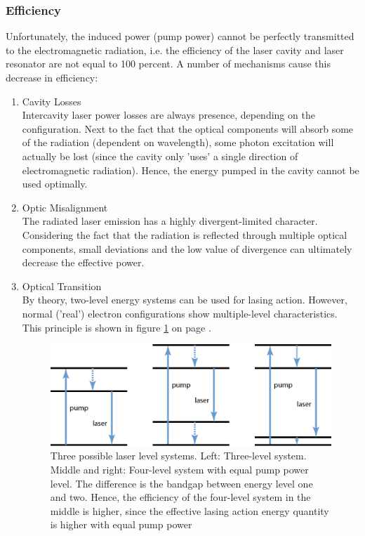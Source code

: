 	\subsubsection{Efficiency}
Unfortunately, the induced power (pump power) cannot be perfectly transmitted to the electromagnetic radiation, i.e. the efficiency of the \acs{laser} cavity and \acs{laser} resonator are not equal to 100 percent. A number of mechanisms cause this decrease in efficiency:
	\begin{enumerate}
		\item{Cavity Losses}\\
Intercavity \acs{laser} power losses are always presence, depending on the configuration. Next to the fact that the optical components will absorb some of the radiation (dependent on wavelength), some photon excitation will actually be lost (since the cavity only 'uses' a single direction of electromagnetic radiation). Hence, the energy pumped in the cavity cannot be used optimally. 
		\item{Optic Misalignment}\\
The radiated \acs{laser} emission has a highly divergent-limited character. Considering the fact that the radiation is reflected through multiple optical components, small deviations and the low value of divergence can ultimately decrease the effective power.
		\item{Optical Transition}\\
By theory, two-level energy systems can be used for lasing action. However, normal ('real') electron configurations show multiple-level characteristics. This principle is shown in figure \ref{fig:4_level_system} on page \pageref{fig:4_level_system}.

\begin{figure}[ht!]
\centering
\includegraphics[scale=0.5]{chapters/img/4_level_system.png}
\caption{Three possible laser level systems. Left: Three-level system. Middle and right: Four-level system with equal pump power level. The difference is the bandgap between energy level one and two. Hence, the efficiency of the four-level system in the middle is higher, since the effective lasing action energy quantity is higher with equal pump power}
\label{fig:4_level_system}
\end{figure}
  
	\end{enumerate} 

